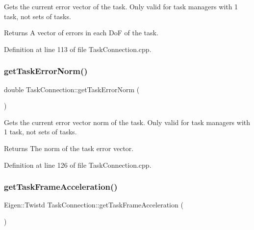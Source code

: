 Gets the current error vector of the task.  Only valid for task managers with 1 task, not sets of tasks.

\begin{DoxyReturn}{Returns}
A vector of errors in each DoF of the task. 
\end{DoxyReturn}


Definition at line 113 of file Task\+Connection.\+cpp.

\hypertarget{classocra__recipes_1_1TaskConnection_a2639764e4b7fe55aa29dce82a2268b3a}{}\label{classocra__recipes_1_1TaskConnection_a2639764e4b7fe55aa29dce82a2268b3a} 
\subsubsection{\texorpdfstring{get\+Task\+Error\+Norm()}{getTaskErrorNorm()}}
{\footnotesize\ttfamily double Task\+Connection\+::get\+Task\+Error\+Norm (\begin{DoxyParamCaption}{ }\end{DoxyParamCaption})}

Gets the current error vector norm of the task.  Only valid for task managers with 1 task, not sets of tasks.

\begin{DoxyReturn}{Returns}
The norm of the task error vector. 
\end{DoxyReturn}


Definition at line 126 of file Task\+Connection.\+cpp.

\hypertarget{classocra__recipes_1_1TaskConnection_a83e90c36f53ffda20f73b242c5de285b}{}\label{classocra__recipes_1_1TaskConnection_a83e90c36f53ffda20f73b242c5de285b} 
\subsubsection{\texorpdfstring{get\+Task\+Frame\+Acceleration()}{getTaskFrameAcceleration()}}
{\footnotesize\ttfamily Eigen\+::\+Twistd Task\+Connection\+::get\+Task\+Frame\+Acceleration (\begin{DoxyParamCaption}{ }\end{DoxyParamCaption})}



